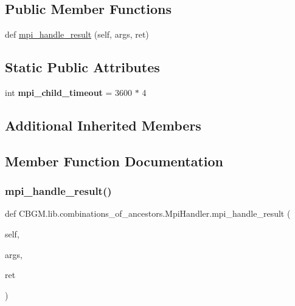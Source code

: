 \subsection*{Public Member Functions}
\begin{DoxyCompactItemize}
\item 
def \hyperlink{classCBGM_1_1lib_1_1combinations__of__ancestors_1_1MpiHandler_a2a59dbe4025f51463eb1e8c148a3399c}{mpi\+\_\+handle\+\_\+result} (self, args, ret)
\end{DoxyCompactItemize}
\subsection*{Static Public Attributes}
\begin{DoxyCompactItemize}
\item 
\mbox{\label{classCBGM_1_1lib_1_1combinations__of__ancestors_1_1MpiHandler_a78dba6ee5fcff75c4f59875ca76dd378}} 
int {\bfseries mpi\+\_\+child\+\_\+timeout} = 3600 $\ast$ 4
\end{DoxyCompactItemize}
\subsection*{Additional Inherited Members}


\subsection{Member Function Documentation}
\mbox{\label{classCBGM_1_1lib_1_1combinations__of__ancestors_1_1MpiHandler_a2a59dbe4025f51463eb1e8c148a3399c}} 
\subsubsection{\texorpdfstring{mpi\+\_\+handle\+\_\+result()}{mpi\_handle\_result()}}
{\footnotesize\ttfamily def C\+B\+G\+M.\+lib.\+combinations\+\_\+of\+\_\+ancestors.\+Mpi\+Handler.\+mpi\+\_\+handle\+\_\+result (\begin{DoxyParamCaption}\item[{}]{self,  }\item[{}]{args,  }\item[{}]{ret }\end{DoxyParamCaption})}

